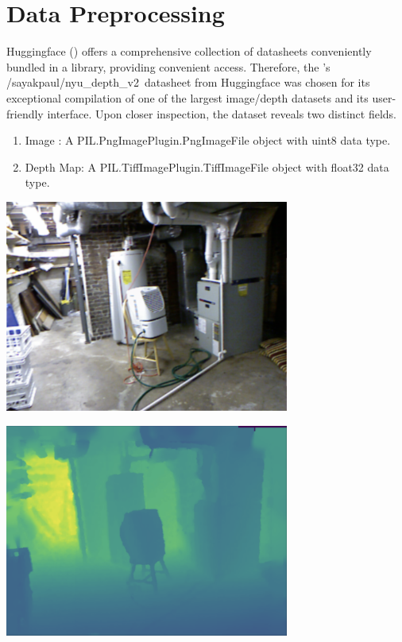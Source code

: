 \documentclass{article} %
\begin{document}

\section{Data Preprocessing}

Huggingface (\cite{huggingface}) offers a comprehensive collection of datasheets conveniently bundled in a library, providing convenient access. Therefore, the \cite{Silberman:ECCV12}'s /sayakpaul/nyu\_depth\_v2\   datasheet from Huggingface was chosen for its exceptional compilation of one of the largest image/depth datasets and its user-friendly interface. Upon closer inspection, the dataset reveals two distinct fields.

\begin{enumerate}
    \item Image : A PIL.PngImagePlugin.PngImageFile object with uint8 data type.
    \item Depth Map: A PIL.TiffImagePlugin.TiffImageFile object with float32 data type.
\end{enumerate}

\begin{minipage}{.5\textwidth}
    \centering
    \includegraphics[width = 0.7\textwidth]{Figs/image.png}
    \label{image}
\end{minipage}%
\begin{minipage}{.5\textwidth}
    \centering
    \includegraphics[width = 0.7\textwidth]{Figs/depth_map.png}
    \label{depth_map}
\end{minipage}
\end{document}
